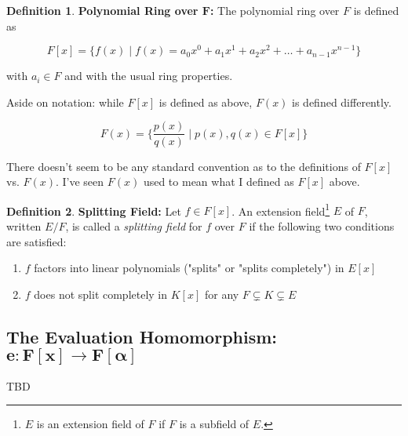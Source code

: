 \documentclass[11pt, oneside]{article}   	%
\theoremstyle{definition}
\newtheorem{definition}{Definition}[section]
\begin{document}
\begin{definition}
\textbf{Polynomial Ring over $\mathbf{F}$:} The polynomial ring over $F$ is defined as 

\begin{equation*}
F[x] = \{f(x) \mid f(x) = a_0x^0 + a_1x^1 +a_2x^2 + \hdots + a_{n-1}x^{n-1} \}
\end{equation*}

\bigskip
\noindent
with $a_i \in F$ and with the usual ring properties.

\bigskip
\noindent
Aside on notation: while $F[x]$ is defined as above, $F(x)$ is defined differently. 

\begin{equation*}
F(x) = \Bigg  \{\frac{p(x)}{q(x)} \; \bigg \lvert  \; p(x),q(x) \in F[x]  \Bigg \}
\end{equation*}
\label{def:polynomials}
\end{definition}

\noindent
There doesn't seem to be any standard convention as to the definitions of  $F[x]$ vs. $F(x)$. I've seen $F(x)$ used to mean what I 
defined as $F[x]$ above.

\begin{definition}
\textbf{Splitting Field:} Let $f \in F[x]$. An extension field\footnote{$E$ is an extension field of $F$ if $F$ is a subfield of $E$.} 
$E$ of $F$, written $E/F$,  is called a \emph{splitting field} for $f$ over $F$ if the following two 
conditions are satisfied:

\begin{enumerate}
\item $f$ factors into linear polynomials ("splits" or "splits completely") in $E [x]$
\item $f$ does not split completely in $K[x]$ for any $F \subsetneq K \subsetneq E$
\end{enumerate}
\label{def:splitting_field}
\end{definition}

\subsection{The Evaluation Homomorphism: $\boldsymbol{e: F[x] \rightarrow F[\alpha]}$}
TBD

\end{document}
